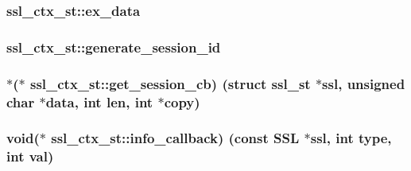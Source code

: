 \subsubsection[{\texorpdfstring{ex\+\_\+data}{ex_data}}]{ ssl\+\_\+ctx\+\_\+st\+::ex\+\_\+data}\hypertarget{structssl__ctx__st_a5deb70881c01f2e35ea2fa46c37ba21e}{}\label{structssl__ctx__st_a5deb70881c01f2e35ea2fa46c37ba21e}
\subsubsection[{\texorpdfstring{generate\+\_\+session\+\_\+id}{generate_session_id}}]{ ssl\+\_\+ctx\+\_\+st\+::generate\+\_\+session\+\_\+id}\hypertarget{structssl__ctx__st_a4485f799f50830d69fa26e7514b032dc}{}\label{structssl__ctx__st_a4485f799f50830d69fa26e7514b032dc}
\subsubsection[{\texorpdfstring{get\+\_\+session\+\_\+cb}{get_session_cb}}]{$\ast$($\ast$ ssl\+\_\+ctx\+\_\+st\+::get\+\_\+session\+\_\+cb) (struct {\bf ssl\+\_\+st} $\ast$ssl, unsigned char $\ast$data, int {\bf len}, int $\ast$copy)}\hypertarget{structssl__ctx__st_ac177321ecedb6c1adc3b8abb703607c2}{}\label{structssl__ctx__st_ac177321ecedb6c1adc3b8abb703607c2}
\subsubsection[{\texorpdfstring{info\+\_\+callback}{info_callback}}]{\setlength{\rightskip}{0pt plus 5cm}void($\ast$ ssl\+\_\+ctx\+\_\+st\+::info\+\_\+callback) (const {\bf S\+SL} $\ast$ssl, int {\bf type}, int val)}\hypertarget{structssl__ctx__st_aad6ab81d36b3ea41bc75aa86586396dc}{}\label{structssl__ctx__st_aad6ab81d36b3ea41bc75aa86586396dc}
